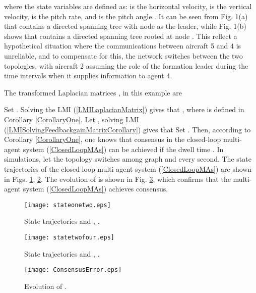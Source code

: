 \documentclass[letterpaper, 10 pt, conference]{ieeeconf}
\begin{document}
where the state variables are defined as:  is the horizontal velocity,
 is the vertical velocity,
   is the pitch rate, and
 is the
pitch angle \cite{FeiJi}. It can be seen from Fig. 1(a) that
 contains
a directed spanning tree with node
 as the leader, while Fig. 1(b) shows that
 contains
a directed spanning tree rooted at
node . This reflect a hypothetical situation where the communications
between aircraft 5 and 4 is unreliable, and to compensate for this, the
network switches between the two topologies, with aircraft 2 assuming the role
of the formation leader during the time intervals when it supplies
information to agent 4.

The transformed Laplacian matrices ,
 in this example are


Set . Solving the LMI (\ref{LMILaplacianMatrix}) gives
that , where
 is defined in Corollary
\ref{CorollaryOne}. Let , solving LMI
(\ref{LMISolvingFeedbackgainMatrixCorollary}) gives
that   Set . Then, according to
Corollary \ref{CorollaryOne}, one knows that consensus in the closed-loop
multi-agent system (\ref{ClosedLoopMAs}) can be achieved if the dwell time
. In simulations, let the topology switches among graph
 and  every
 second. The state trajectories of the closed-loop multi-agent system
(\ref{ClosedLoopMAs}) are shown in Figs. \ref{FigureStateOne},
\ref{FigureStateTwo}. The evolution of  is shown in
Fig. \ref{FigureConsensusError}, which
confirms that the multi-agent system (\ref{ClosedLoopMAs}) achieves
consensus.


\begin{figure}[!t]
\centering
\texttt{[image: stateonetwo.eps]}
 \caption{State trajectories  and , . }
\label{FigureStateOne}
\end{figure}

\begin{figure}[!t]
\centering
\texttt{[image: statetwofour.eps]}
 \caption{State trajectories  and , . }
\label{FigureStateTwo}
\end{figure}


\begin{figure}[!t]
\centering
\texttt{[image: ConsensusError.eps]}
 \caption{Evolution of . }
\label{FigureConsensusError}
\end{figure}
\end{document}
